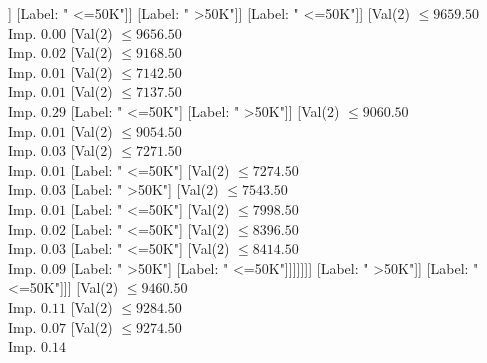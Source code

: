 \documentclass[margin=10pt]{standalone}
\begin{document}
\begin{forest}
																		[Val($2$) $ \leq 6511.50$ \\ Imp. $0.07$
																			[Val($2$) $ \leq 6002.50$ \\ Imp. $0.01$
																				[Val($2$) $ \leq 5996.50$ \\ Imp. $0.11$
																					[Label: " <=50K"]
																					[Label: " >50K"]]
																				[Label: " <=50K"]]
																			[Label: " >50K"]]
																		[Label: " <=50K"]]
																	[Val($2$) $ \leq 9659.50$ \\ Imp. $0.00$
																		[Val($2$) $ \leq 9656.50$ \\ Imp. $0.02$
																			[Val($2$) $ \leq 9168.50$ \\ Imp. $0.01$
																				[Val($2$) $ \leq 7142.50$ \\ Imp. $0.01$
																					[Val($2$) $ \leq 7137.50$ \\ Imp. $0.29$
																						[Label: " <=50K"]
																						[Label: " >50K"]]
																					[Val($2$) $ \leq 9060.50$ \\ Imp. $0.01$
																						[Val($2$) $ \leq 9054.50$ \\ Imp. $0.03$
																							[Val($2$) $ \leq 7271.50$ \\ Imp. $0.01$
																								[Label: " <=50K"]
																								[Val($2$) $ \leq 7274.50$ \\ Imp. $0.03$
																									[Label: " >50K"]
																									[Val($2$) $ \leq 7543.50$ \\ Imp. $0.01$
																										[Label: " <=50K"]
																										[Val($2$) $ \leq 7998.50$ \\ Imp. $0.02$
																											[Label: " <=50K"]
																											[Val($2$) $ \leq 8396.50$ \\ Imp. $0.03$
																												[Label: " <=50K"]
																												[Val($2$) $ \leq 8414.50$ \\ Imp. $0.09$
																													[Label: " >50K"]
																													[Label: " <=50K"]]]]]]]
																							[Label: " >50K"]]
																						[Label: " <=50K"]]]
																				[Val($2$) $ \leq 9460.50$ \\ Imp. $0.11$
																					[Val($2$) $ \leq 9284.50$ \\ Imp. $0.07$
																						[Val($2$) $ \leq 9274.50$ \\ Imp. $0.14$

\end{forest}
\end{document}
